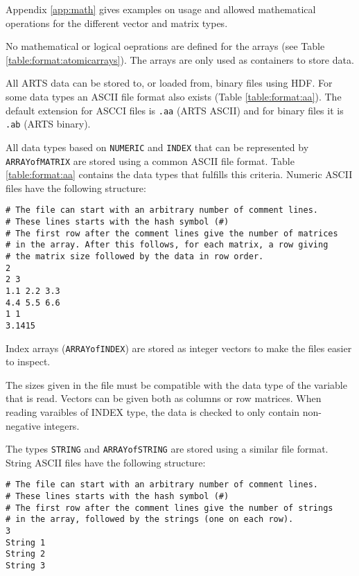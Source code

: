  Appendix \ref{app:math} gives examples on usage and allowed
 mathematical operations for the different vector and matrix types.
 
 No mathematical or logical oeprations are defined for the arrays (see
 Table \ref{table:format:atomicarrays}). The arrays are only used as
 containers to store data.


 \label{sec:formats:files}
 
 All ARTS data can be stored to, or loaded from, binary files using
 HDF.  For some data types an ASCII file format also exists (Table
 \ref{table:format:aa}). The default extension for ASCCI files is
 \verb|.aa| (ARTS ASCII) and for binary files it is \verb|.ab| (ARTS
 binary).
 
  \label{sec:formats:file:ascii}
  
  All data types based on \verb|NUMERIC| and \verb|INDEX| that can be
  represented by \verb|ARRAYofMATRIX| are stored using a common ASCII
  file format. Table \ref{table:format:aa} contains the data types that
  fulfills this criteria. Numeric ASCII files have the following 
  structure: \\
  {\footnotesize \begin{verbatim} 
# The file can start with an arbitrary number of comment lines.  
# These lines starts with the hash symbol (#) 
# The first row after the comment lines give the number of matrices 
# in the array. After this follows, for each matrix, a row giving 
# the matrix size followed by the data in row order.  
2 
2 3 
1.1 2.2 3.3 
4.4 5.5 6.6 
1 1 
3.1415
 \end{verbatim} 
}

 \noindent
 Index arrays (\verb|ARRAYofINDEX|) are stored as integer vectors to
 make the files easier to inspect.
     
 The sizes given in the file must be compatible with the data type
 of the variable that is read. Vectors can be given both as
 columns or row matrices. When reading varaibles of INDEX type,
 the data is checked to only contain non-negative integers.
 
 The types \verb|STRING| and \verb|ARRAYofSTRING| are stored using a
 similar file format. String ASCII files have the following structure:
 {\footnotesize \begin{verbatim} 
# The file can start with an arbitrary number of comment lines.
# These lines starts with the hash symbol (#)
# The first row after the comment lines give the number of strings
# in the array, followed by the strings (one on each row).  
3
String 1
String 2
String 3
 \end{verbatim} 
}

